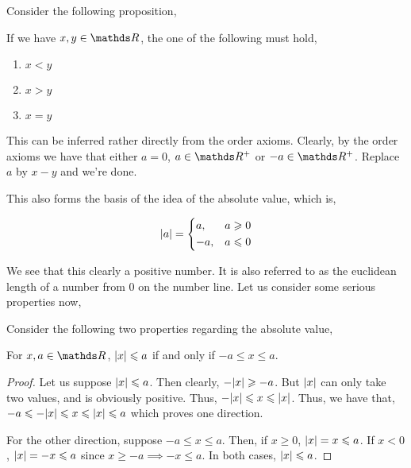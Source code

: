 Consider the following proposition, 

\begin{plainprop}[Trichotomy]
    If we have \(x, y \in \RR\), the one of the following must hold, 
    \begin{enumerate}
        \item \(x < y\)
        \item \(x > y\)
        \item \(x = y\)
    \end{enumerate}
\end{plainprop}

This can be inferred rather directly from the order axioms. Clearly, by the order 
axioms we have that either \(a = 0\), \(a \in \RR^+\) or \(-a \in \RR^+\).
Replace \(a\) by \(x - y\) and we're done.

This also forms the basis of the idea of the absolute value, which is, 

\begin{equation}
    \abs{a} = 
    \begin{dcases}
        a, & a \geqslant 0 \\
        -a, & a \leqslant 0
    \end{dcases}
\end{equation}

We see that this clearly a positive number. It is also referred to as the euclidean length of 
a number from \(0\) on the number line. Let us consider some serious properties now, 

Consider the following two properties regarding the absolute value,

\begin{plaintheo}
    For \(x, a \in \RR\), \(\abs{x} \leqslant a\) if and only if \( -a \le x \le a\).
\end{plaintheo}

\begin{proof}
    Let us suppose \(\abs{x} \leqslant a\). Then clearly, \(-\abs{x} \geqslant -a\). But 
    \(\abs{x}\) can only take two values, and is obviously positive. Thus, \(-\abs{x} \leqslant 
    x \leqslant \abs{x}\). Thus, we have that, \(-a \leqslant -\abs{x} \leqslant x \leqslant \abs{x} \leqslant a\) which 
    proves one direction.
    
    For the other direction, suppose \(-a \le x \le a\). Then, if \(x \ge 0\), 
    \(\abs{x} = x \leqslant a\). If \(x < 0\), \(\abs{x} = -x \leqslant a\) since \(x \ge -a \implies -x \le a\).
    In both cases, \(\abs{x} \leqslant a\). 
\end{proof}
